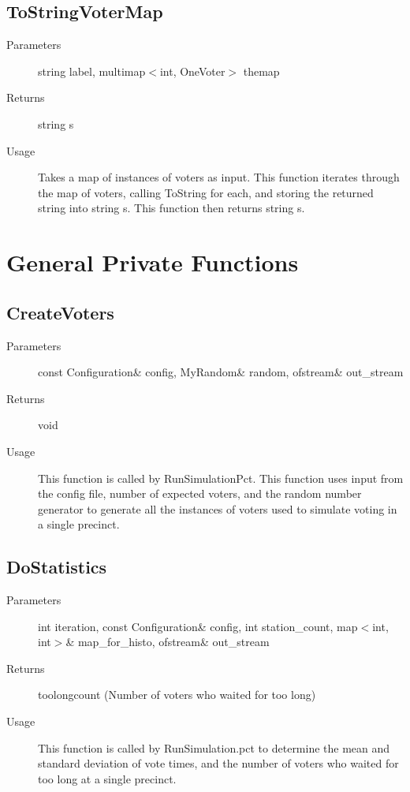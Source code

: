 \subsection{ToStringVoterMap}
\begin{description}
\item[Parameters] string label, multimap$<$int, OneVoter$>$ themap
\item[Returns] string s
\item[Usage] Takes a map of instances of voters as input.  This function iterates through the map of voters, calling ToString for each, and storing the returned string into string s.  This function then returns string s.
\end{description}


\section{General Private Functions}

\subsection{CreateVoters}
\begin{description}
\item[Parameters] const Configuration\& config, MyRandom\& random, ofstream\& out\_stream
\item[Returns] void
\item[Usage] This function is called by RunSimulationPct.  This function uses input from the config file, number of expected voters, and the random number generator to generate all the instances of voters used to simulate voting in a single precinct.
\end{description}

\subsection{DoStatistics}
\begin{description}
\item[Parameters] int iteration, const Configuration\& config, int station\_count, map$<$int, int$>$\& map\_for\_histo, ofstream\& out\_stream
\item[Returns] toolongcount (Number of voters who waited for too long)
\item[Usage] This function is called by RunSimulation.pct to determine the mean and standard deviation of vote times, and the number of voters who waited for too long at a single precinct.
\end{description}

